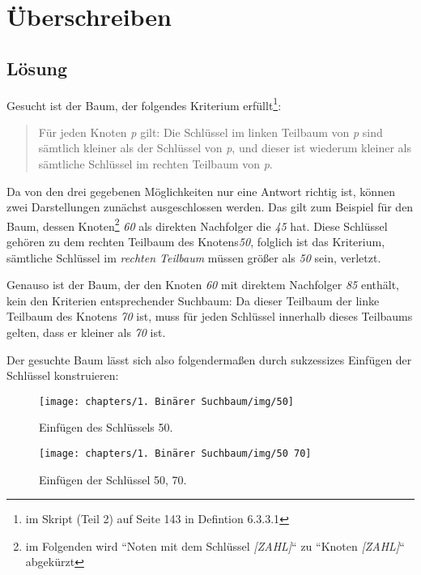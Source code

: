 \chapter{Überschreiben}

\section*{Lösung}

Gesucht ist der Baum, der folgendes Kriterium erfüllt\footnote{im Skript (Teil 2) auf Seite 143 in Defintion 6.3.3.1}:

\blockquote[{\cite[263, Hervorhebungen i.O.]{OW17}}]{
    Für jeden Knoten \textit{p} gilt:
    Die Schlüssel im linken Teilbaum von \textit{p} sind sämtlich kleiner als der Schlüssel von \textit{p},
    und dieser ist wiederum kleiner als sämtliche Schlüssel im rechten Teilbaum von \textit{p}.
}

Da von den drei gegebenen Möglichkeiten nur eine Antwort richtig ist, können zwei Darstellungen zunächst ausgeschlossen werden.
Das gilt zum Beispiel für den Baum, dessen Knoten\footnote{
    im Folgenden wird ``Noten mit dem Schlüssel \textit{[ZAHL]}`` zu ``Knoten \textit{[ZAHL]}`` abgekürzt
} \textit{60} als direkten Nachfolger die \textit{45} hat.
Diese Schlüssel gehören zu dem rechten Teilbaum des Knotens\textit{50}, folglich ist das Kriterium, sämtliche Schlüssel im
\textit{rechten Teilbaum} müssen größer als \textit{50} sein, verletzt.

Genauso ist der Baum, der den Knoten \textit{60} mit direktem Nachfolger \textit{85} enthält, kein den Kriterien entsprechender Suchbaum:
Da dieser Teilbaum der linke Teilbaum des Knotens \textit{70} ist, muss für jeden Schlüssel innerhalb dieses Teilbaums gelten,
dass er kleiner als \textit{70} ist.

Der gesuchte Baum lässt sich also folgendermaßen durch sukzessizes Einfügen der Schlüssel konstruieren:


\begin{figure}[h]
    \centering
    \texttt{[image: chapters/1. Binärer Suchbaum/img/50]}
    \caption{Einfügen des Schlüssels 50.}
\end{figure}

\begin{figure}[h]
    \centering
    \texttt{[image: chapters/1. Binärer Suchbaum/img/50 70]}
    \caption{Einfügen der Schlüssel 50, 70.}
\end{figure}

